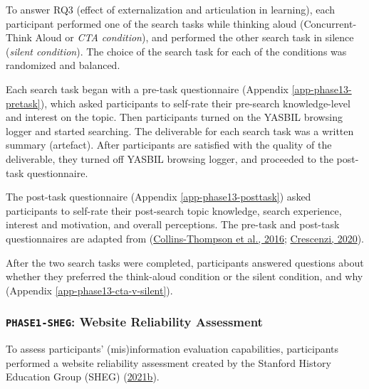 \documentclass[letterpaper, nobind]{templates/ociamthesis}
\begin{document}
To answer RQ3 (effect of externalization and articulation in learning), each participant performed one of the search tasks while thinking aloud (Concurrent-Think Aloud or \emph{CTA condition}), and performed the other search task in silence (\emph{silent condition}).
The choice of the search task for each of the conditions was randomized and balanced.

Each search task began with a pre-task questionnaire (Appendix \ref{app-phase13-pretask}), which asked participants to self-rate their pre-search knowledge-level and interest on the topic.
Then participants turned on the YASBIL browsing logger and started searching.
The deliverable for each search task was a written summary (artefact).
After participants are satisfied with the quality of the deliverable, they turned off YASBIL browsing logger, and proceeded to the post-task questionnaire.

The post-task questionnaire (Appendix \ref{app-phase13-posttask}) asked participants to self-rate their post-search topic knowledge, search experience, interest and motivation, and overall perceptions.
The pre-task and post-task questionnaires are adapted from (\protect\hyperlink{ref-collins2016assessing}{Collins-Thompson et al., 2016}; \protect\hyperlink{ref-crescenzi2020adaptation}{Crescenzi, 2020}).

After the two search tasks were completed, participants answered questions about whether they preferred the think-aloud condition or the silent condition, and why (Appendix \ref{app-phase13-cta-v-silent}).

\hypertarget{phase1-sheg-website-reliability-assessment}{%
\subsubsection{\texorpdfstring{\texttt{PHASE1-SHEG}: Website Reliability Assessment}{PHASE1-SHEG: Website Reliability Assessment}}\label{phase1-sheg-website-reliability-assessment}}

To assess participants' (mis)information evaluation capabilities, participants performed a website reliability assessment created by the Stanford History Education Group (SHEG) (\protect\hyperlink{ref-sheg2021website-reliability}{2021b}).
\end{document}
